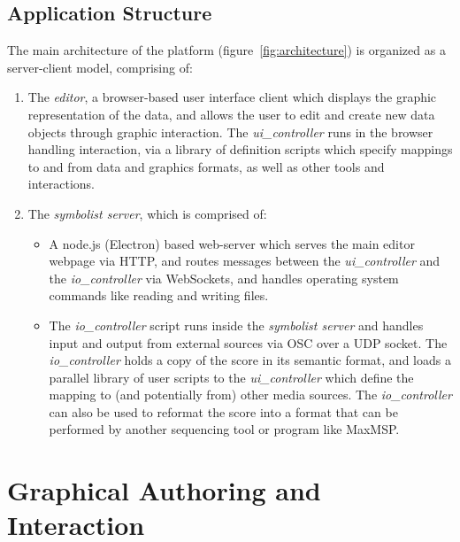 \documentclass{article}
\begin{document}
\subsection{Application Structure}\label{subsec:application_structure}

The main architecture of the platform (figure~\ref{fig:architecture}) is organized as a server-client model, comprising of:

\begin{enumerate}\itemsep0pt 
\item The \textit{editor}, a browser-based user interface client which displays the graphic representation of the data, and allows the user to edit and create new data objects through graphic interaction. The \textit{ui\_controller} runs in the browser handling interaction, via a library of definition scripts which specify mappings to and from data and graphics formats, as well as other tools and interactions.

\item The \textit{symbolist server}, which is comprised of: 
\begin{itemize}\itemsep0pt 

\item A node.js (Electron) based web-server which serves the main editor webpage via HTTP, and routes messages between the \textit{ui\_controller} and the \textit{io\_controller} via WebSockets, and handles operating system commands like reading and writing files.

\item  The \textit{io\_controller} script runs inside the \textit{symbolist server} and handles input and output from external sources via OSC over a UDP socket. The \textit{io\_controller} holds a copy of the score in its semantic format, and loads a parallel library of user scripts to the \textit{ui\_controller} which define the mapping to (and potentially from) other media sources. The \textit{io\_controller} can also be used to reformat the score into a format that can be performed by another sequencing tool or program like MaxMSP.
\end{itemize}

\end{enumerate}


\section{Graphical Authoring and Interaction}\label{editor} %
\end{document}
